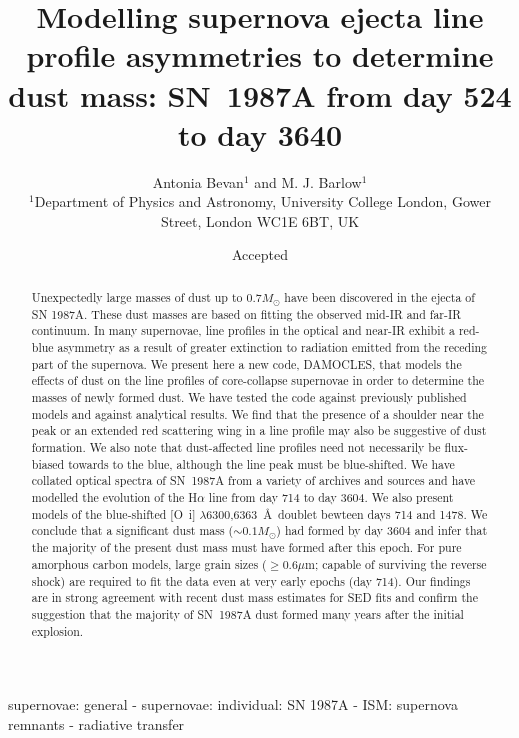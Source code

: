 \documentclass[useAMS,usenatbib,usegraphicx]{mnras}
\title[The first ten years of dust evolution in SN~1987A from 
optical line profile asymmetries]{Modelling supernova ejecta line profile asymmetries to determine dust mass:  SN~1987A from day 524 to day 3640}
\author[Antonia Bevan and M. J. Barlow]{Antonia Bevan$^{1}$ and M. J. 
Barlow$^{1}$\\
$^{1}$Department of Physics and Astronomy, University College London, 
Gower Street, London WC1E 6BT, UK}
\begin{document}
\date{Accepted}

\pagerange{\pageref{firstpage}--\pageref{lastpage}} 

\maketitle

\label{firstpage}

\begin{abstract}

Unexpectedly large masses of dust up to $0.7M_{\odot}$ have been 
discovered in the ejecta of SN 1987A.  These dust masses are based on 
fitting the observed mid-IR and far-IR continuum.  In many 
supernovae, line profiles in the optical and near-IR exhibit a red-blue 
asymmetry as a result of greater extinction to radiation emitted from the 
receding part of the supernova.  We  present here a new code, DAMOCLES, 
that models the effects of dust on the line profiles of core-collapse 
supernovae in order to determine the masses of newly formed dust.  We have 
tested the code against previously published models and against analytical 
results.  We find that the presence of a shoulder near the peak or an 
extended red scattering wing in a line profile may also be suggestive of dust 
formation.  We also note that dust-affected line profiles need not 
necessarily be flux-biased towards to the blue, although the line
peak must be blue-shifted. We have collated optical spectra of SN~1987A from a variety 
of archives and sources and have modelled the evolution of the H$\alpha$ line from day 714 
to day 3604.  We also present models of the blue-shifted 
[O~{\sc i}] $\lambda$6300,6363~\AA\ doublet bewteen days 714 and 1478.  We 
conclude that a significant dust mass ($\sim 0.1M_{\odot}$) had 
formed by day 3604 and infer that the majority of the present dust mass must 
have formed after this epoch.  For pure amorphous carbon models, large grain 
sizes ($\geqslant 0.6\mu$m; capable of surviving the reverse shock) are 
required to fit the data even at very early epochs (day 714).  Our 
findings are in strong agreement with recent dust mass estimates for SED fits and confirm 
the suggestion that the majority of SN~1987A dust formed many years after the 
initial explosion.

\end{abstract}

\begin{keywords}
supernovae: general  -  supernovae: individual: SN 1987A  -  ISM: 
supernova remnants  - radiative transfer
\end{keywords}
\end{document}
